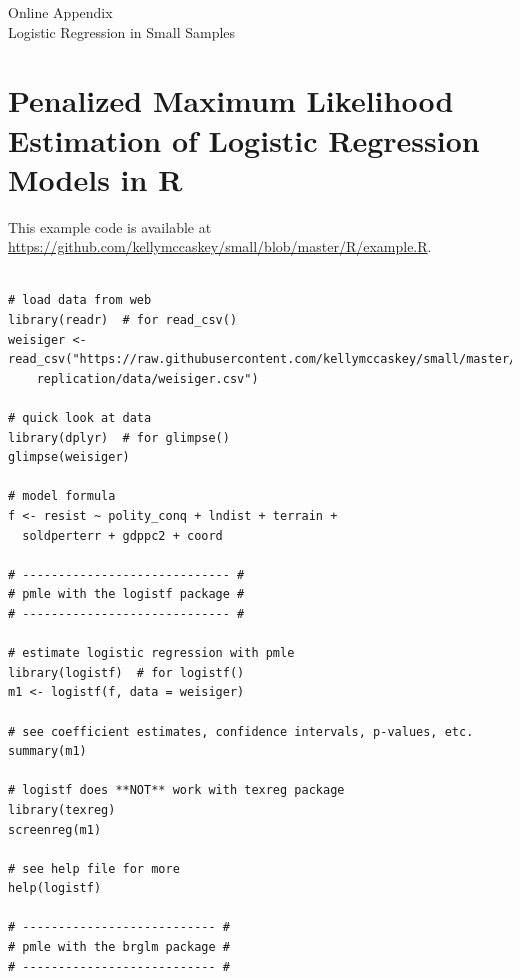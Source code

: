 \documentclass[12pt]{article}
\begin{document}
\singlespace 
\newpage
\normalsize

%


\newpage
\begin{appendix}
\begin{center}
{\LARGE Online Appendix}\\
\vspace{3mm}
{\large Logistic Regression in Small Samples}\\\vspace{2mm}
\end{center}

\section{Penalized Maximum Likelihood Estimation of Logistic Regression Models in R}\label{sec:pmle-in-R}

This example code is available at \href{https://github.com/kellymccaskey/small/blob/master/R/example.R}{https://github.com/kellymccaskey/small/blob/master/R/example.R}.

\begin{footnotesize}
\begin{verbatim}

# load data from web
library(readr)  # for read_csv()
weisiger <- read_csv("https://raw.githubusercontent.com/kellymccaskey/small/master/weisiger-
	replication/data/weisiger.csv") 

# quick look at data
library(dplyr)  # for glimpse()
glimpse(weisiger)

# model formula
f <- resist ~ polity_conq + lndist + terrain + 
  soldperterr + gdppc2 + coord

# ----------------------------- #
# pmle with the logistf package #
# ----------------------------- #

# estimate logistic regression with pmle
library(logistf)  # for logistf()
m1 <- logistf(f, data = weisiger)

# see coefficient estimates, confidence intervals, p-values, etc.
summary(m1)

# logistf does **NOT** work with texreg package
library(texreg)
screenreg(m1)

# see help file for more
help(logistf)

# --------------------------- #
# pmle with the brglm package #
# --------------------------- #


\end{verbatim}
\end{footnotesize}
\end{appendix}
\end{document}
